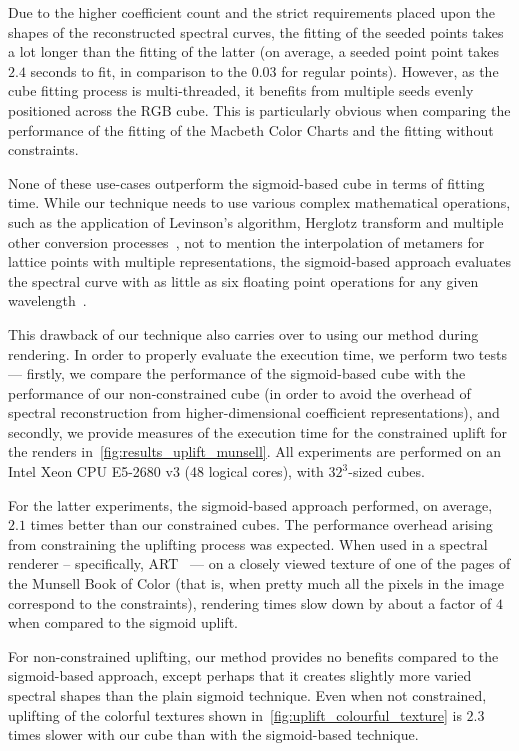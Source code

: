 Due to the higher coefficient count and the strict requirements placed upon the shapes of the reconstructed spectral curves, the fitting of the seeded points takes a lot longer than the fitting of the latter (on average, a seeded point point takes $2.4$ seconds to fit, in comparison to the $0.03$ for regular points). However, as the cube fitting process is multi-threaded, it benefits from multiple seeds evenly positioned across the RGB cube. This is particularly obvious when comparing the performance of the fitting of the Macbeth Color Charts and the fitting without constraints.

None of these use-cases outperform the sigmoid-based cube in terms of fitting time. While our technique needs to use various complex mathematical operations, such as the application of Levinson's algorithm, Herglotz transform and multiple other conversion processes~\cite{trigonometricMomentsPaper}, not to mention the interpolation of metamers for lattice points with multiple representations, the sigmoid-based approach evaluates the spectral curve with as little as six floating point operations for any given wavelength~\cite{upsamplingJakobHanika}.

This drawback of our technique also carries over to using our method during rendering. In order to properly evaluate the execution time, we perform two tests --- firstly, we compare the performance of the sigmoid-based cube with the performance of our non-constrained cube (in order to avoid the overhead of spectral reconstruction from higher-dimensional coefficient representations), and secondly, we provide measures of the execution time for the constrained uplift for the renders in~\cref{fig:results_uplift_munsell}. All experiments are performed on an Intel Xeon CPU E5-2680 v3 (48 logical cores), with $32^3$-sized cubes.

For the latter experiments, the sigmoid-based approach performed, on average, $2.1$ times better than our constrained cubes. The performance overhead arising from constraining the uplifting process was expected. When used in a spectral renderer -- specifically, ART~\cite{ART} --- on a closely viewed texture of one of the pages of the Munsell Book of Color (that is, when pretty much all the pixels in the image correspond to the constraints), rendering times slow down by about a factor of $4$ when compared to the sigmoid uplift.

For non-constrained uplifting, our method provides no benefits compared to the sigmoid-based approach, except perhaps that it creates slightly more varied spectral shapes than the plain sigmoid technique. Even when not constrained, uplifting of the colorful textures shown in~\cref{fig:uplift_colourful_texture} is $2.3$ times slower with our cube than with the sigmoid-based technique.

